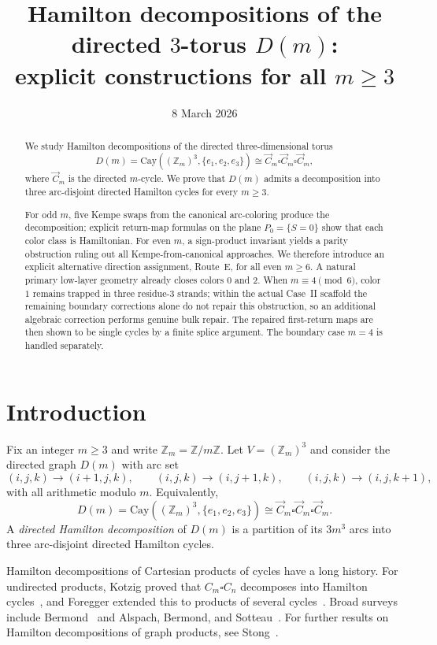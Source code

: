 \documentclass[11pt]{article}
\title{Hamilton decompositions of the directed $3$-torus $D(m)$:\\
explicit constructions for all $m\ge 3$}
\author{}
\date{8 March 2026}
\begin{document}
\maketitle

\begin{abstract}
We study Hamilton decompositions of the directed three-dimensional torus
\[
D(m)=\mathrm{Cay}((\mathbb Z_m)^3,\{e_1,e_2,e_3\})\cong \vec C_m\square \vec C_m\square \vec C_m,
\]
where $\vec C_m$ is the directed $m$-cycle.
We prove that $D(m)$ admits a decomposition into three arc-disjoint directed Hamilton cycles for every $m\ge 3$.

For odd $m$, five Kempe swaps from the canonical arc-coloring produce the decomposition;
explicit return-map formulas on the plane $P_0=\{S=0\}$ show that each color class is Hamiltonian.
For even $m$, a sign-product invariant yields a parity obstruction ruling out all Kempe-from-canonical approaches.
We therefore introduce an explicit alternative direction assignment, Route~E, for all even $m\ge 6$.
A natural primary low-layer geometry already closes colors $0$ and $2$.
When $m\equiv 4\pmod 6$, color $1$ remains trapped in three residue-$3$ strands;
within the actual Case~II scaffold the remaining boundary corrections alone do not repair this obstruction, so an additional algebraic correction performs genuine bulk repair.
The repaired first-return maps are then shown to be single cycles by a finite splice argument.
The boundary case $m=4$ is handled separately.
\end{abstract}


\section{Introduction}

Fix an integer $m\ge 3$ and write $\mathbb Z_m=\mathbb Z/m\mathbb Z$.
Let $V=(\mathbb Z_m)^3$ and consider the directed graph $D(m)$ with arc set
\[
(i,j,k)\to(i+1,j,k),\qquad (i,j,k)\to(i,j+1,k),\qquad (i,j,k)\to(i,j,k+1),
\]
with all arithmetic modulo $m$.
Equivalently,
\[
D(m)=\mathrm{Cay}((\mathbb Z_m)^3,\{e_1,e_2,e_3\})\cong \vec C_m\square \vec C_m\square \vec C_m.
\]
A \emph{directed Hamilton decomposition} of $D(m)$ is a partition of its $3m^3$ arcs into three arc-disjoint directed Hamilton cycles.

Hamilton decompositions of Cartesian products of cycles have a long history.
For undirected products, Kotzig proved that $C_m\square C_n$ decomposes into Hamilton cycles~\cite{Kotzig1973}, and Foregger extended this to products of several cycles~\cite{Foregger1978}.
Broad surveys include Bermond~\cite{Bermond1978} and Alspach, Bermond, and Sotteau~\cite{AlspachBermondSotteau1990}.
For further results on Hamilton decompositions of graph products, see Stong~\cite{Stong1991}.
\end{document}

